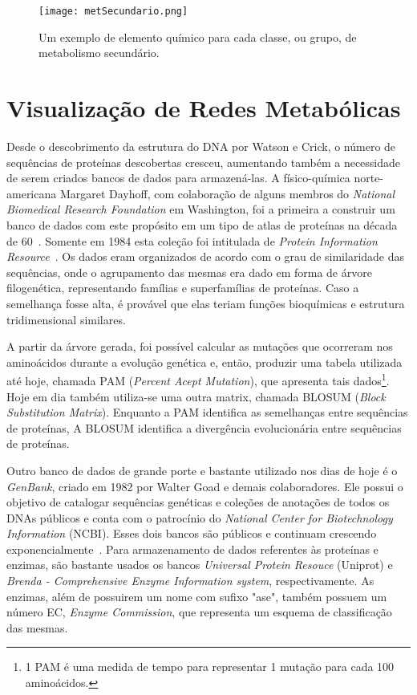 \begin{figure}[h]
    \centering
    \texttt{[image: metSecundario.png]}
    \caption{Um exemplo de elemento químico para cada classe, ou grupo, de metabolismo secundário.}
    \label{fig:metSecundario}
\end{figure} 


\section{Visualização de Redes Metabólicas} \label{BDredes}



\indent Desde o descobrimento da estrutura do DNA por Watson e Crick, o número de sequências de proteínas descobertas cresceu, aumentando também a necessidade de serem criados bancos de dados para armazená-las. A físico-química norte-americana Margaret Dayhoff, com colaboração de alguns membros do \textit{National Biomedical Research Foundation} em Washington, foi a primeira a construir um banco de dados com este propósito em um tipo de atlas de proteínas na década de 60~\cite{mount01}. Somente em 1984 esta coleção foi intitulada de \textit{Protein Information Resource}~\cite{mount01}. Os dados eram organizados de acordo com o grau de similaridade das sequências, onde o agrupamento das mesmas era dado em forma de árvore filogenética, representando famílias e superfamílias de proteínas. Caso a semelhança fosse alta, é provável que elas teriam funções bioquímicas e estrutura tridimensional similares.

\indent A partir da árvore gerada, foi possível calcular as mutações que ocorreram nos aminoácidos durante a evolução genética e, então, produzir uma tabela utilizada até hoje, chamada PAM (\textit{Percent Acept Mutation}), que apresenta tais dados\footnote{1 PAM é uma medida de tempo para representar 1 mutação para cada 100 aminoácidos.}. Hoje em dia também utiliza-se uma outra matrix, chamada BLOSUM (\textit{Block Substitution Matrix}). Enquanto a PAM identifica as semelhanças entre sequências de proteínas, A BLOSUM identifica a divergência evolucionária entre sequências de proteínas.

\indent Outro banco de dados de grande porte e bastante utilizado nos dias de hoje é o \textit{GenBank}, criado em 1982 por Walter Goad e demais colaboradores. Ele possui o objetivo de catalogar sequências genéticas e coleções de anotações de todos os DNAs públicos e conta com o patrocínio do \textit{National Center for Biotechnology Information} (NCBI). Esses dois bancos são públicos e continuam crescendo exponencialmente~\cite{mount01}. Para armazenamento de dados referentes às proteínas e enzimas, são bastante usados os bancos \textit{Universal Protein Resouce} (Uniprot) e \textit{Brenda - Comprehensive Enzyme Information system}, respectivamente. As enzimas, além de possuirem um nome com sufixo "ase", também possuem um número EC, \textit{Enzyme Commission}, que representa um esquema de classificação das mesmas.


